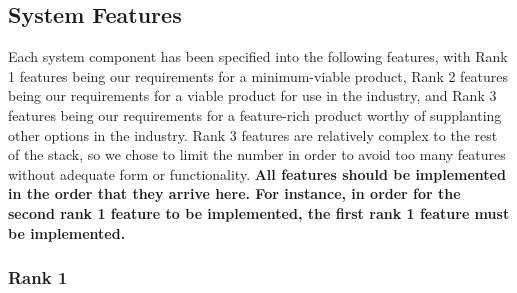 \subsection{System Features}

Each system component has been specified into the following features, with Rank 1 features being our requirements for a minimum-viable product, Rank 2 features being our requirements for a viable product for use in the industry, and Rank 3 features being our requirements for a feature-rich product worthy of supplanting other options in the industry. Rank 3 features are relatively complex to the rest of the stack, so we chose to limit the number in order to avoid too many features without adequate form or functionality. \textbf{All features should be implemented in the order that they arrive here. For instance, in order for the second rank 1 feature to be implemented, the first rank 1 feature must be implemented.}

\subsubsection{Rank 1}

